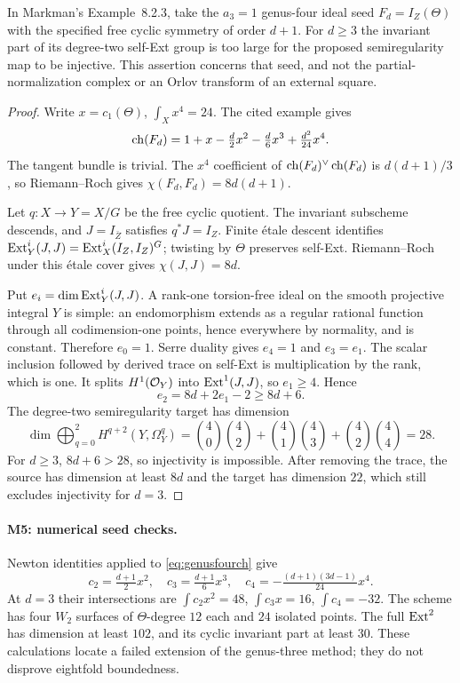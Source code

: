 \begin{proposition}\label{M3}
In Markman's Example~8.2.3, take the $a_3=1$ genus-four ideal seed $F_d=I_Z(\Theta)$ with the specified free cyclic symmetry of order $d+1$. For $d\ge3$ the invariant part of its degree-two self-Ext group is too large for the proposed semiregularity map to be injective. This assertion concerns that seed, and not the partial-normalization complex or an Orlov transform of an external square.
\end{proposition}
\begin{proof}
Write $x=c_1(\Theta)$, $\int_Xx^4=24$. The cited example gives
\begin{equation}\label{eq:genusfourch}
 \operatorname{ch}(F_d)=1+x-\tfrac d2x^2-\tfrac d6x^3+\tfrac{d^2}{24}x^4.
\end{equation}
The tangent bundle is trivial. The $x^4$ coefficient of $\operatorname{ch}(F_d)^\vee\operatorname{ch}(F_d)$ is $d(d+1)/3$, so Riemann--Roch gives $\chi(F_d,F_d)=8d(d+1)$.

Let $q:X\to Y=X/G$ be the free cyclic quotient. The invariant subscheme descends, and $J=I_{\bar Z}$ satisfies $q^*J=I_Z$. Finite \'{e}tale descent identifies
$\operatorname{Ext}^i_Y(J,J)=\operatorname{Ext}^i_X(I_Z,I_Z)^G$; twisting by $\Theta$ preserves self-Ext. Riemann--Roch under this \'{e}tale cover gives $\chi(J,J)=8d$.

Put $e_i=\dim\operatorname{Ext}^i_Y(J,J)$. A rank-one torsion-free ideal on the smooth projective integral $Y$ is simple: an endomorphism extends as a regular rational function through all codimension-one points, hence everywhere by normality, and is constant. Therefore $e_0=1$. Serre duality gives $e_4=1$ and $e_3=e_1$. The scalar inclusion followed by derived trace on self-Ext is multiplication by the rank, which is one. It splits $H^1(\mathcal O_Y)$ into $\operatorname{Ext}^1(J,J)$, so $e_1\ge4$. Hence
\[
 e_2=8d+2e_1-2\ge8d+6.
\]
The degree-two semiregularity target has dimension
\[
 \dim\bigoplus_{q=0}^2H^{q+2}(Y,\Omega_Y^q)
 =\binom40\binom42+\binom41\binom43+\binom42\binom44
 =28.
\]
For $d\ge3$, $8d+6>28$, so injectivity is impossible. After removing the trace, the source has dimension at least $8d$ and the target has dimension $22$, which still excludes injectivity for $d=3$.
\end{proof}

\paragraph{M5: numerical seed checks.}
Newton identities applied to \eqref{eq:genusfourch} give
\[
 c_2=\tfrac{d+1}{2}x^2,\quad
 c_3=\tfrac{d+1}{6}x^3,\quad
 c_4=-\tfrac{(d+1)(3d-1)}{24}x^4.
\]
At $d=3$ their intersections are $\int c_2x^2=48$, $\int c_3x=16$, $\int c_4=-32$. The scheme has four $W_2$ surfaces of $\Theta$-degree $12$ each and $24$ isolated points. The full $\operatorname{Ext}^2$ has dimension at least $102$, and its cyclic invariant part at least $30$. These calculations locate a failed extension of the genus-three method; they do not disprove eightfold boundedness.


